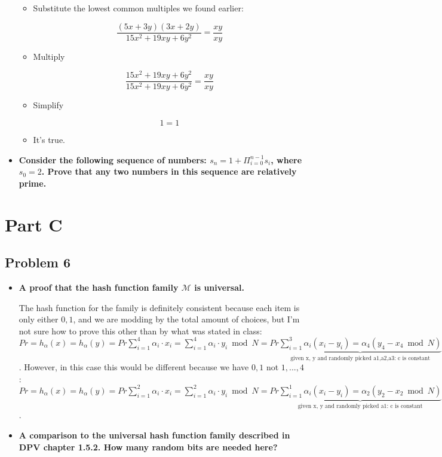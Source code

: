\documentclass[11pt]{article}
\begin{document}
\begin{itemize}
\begin{itemize}
\item Substitute the lowest common multiples we found earlier:

$$ \frac{(5x+3y)(3x+2y)}{15x^2 + 19xy + 6y^2} = \frac{xy}{xy} $$

\item Multiply

$$ \frac{15x^2 + 19xy + 6y^2}{15x^2 + 19xy + 6y^2} = \frac{xy}{xy} $$

\item Simplify

$$ 1 = 1 $$

\item It's true.

\end{itemize}

\item \textbf{Consider the following sequence of numbers: $s_n = 1 +
  \Pi_{i=0}^{n-1} s_i$, where $s_0 = 2$. Prove that any two numbers in
  this sequence are relatively prime.}
\end{itemize}

\section*{Part C}

\subsection*{Problem 6}

\begin{itemize}

\item \textbf{A proof that the hash function family $\mathcal{M}$ is
  universal.}


The hash function for the family is definitely consistent because each item is only either $0,1$, and we are modding by the total amount of choices, but I'm not sure how to prove this other than by what was stated in class: $Pr = { h_\alpha(x) = h_\alpha(y)} = Pr { \sum_{i=1}^4 \alpha_i \cdot x_i = \sum_{i = 1}^4 \alpha_i \cdot y_i \bmod N} = Pr {\underbrace{\sum_{i=1}^3 \alpha_i (x_i - y_i) = \alpha_4 (y_4 - x_4 \bmod N)}_\text{given x, y and randomly picked a1,a2,a3: c is constant}}$. However, in this case this would be different because we have $0,1$ not $1,...,4$: $Pr = { h_\alpha(x) = h_\alpha(y)} = Pr { \sum_{i=1}^2 \alpha_i \cdot x_i = \sum_{i = 1}^2 \alpha_i \cdot y_i \bmod N} = Pr {\underbrace{\sum_{i=1}^1 \alpha_i (x_i - y_i) = \alpha_2 (y_2 - x_2 \bmod N)}_\text{given x, y and randomly picked a1: c is constant}}$.

\item \textbf{A comparison to the universal hash function family described in
  DPV chapter 1.5.2. How many random bits are needed here?}

\end{itemize}
\end{document}
